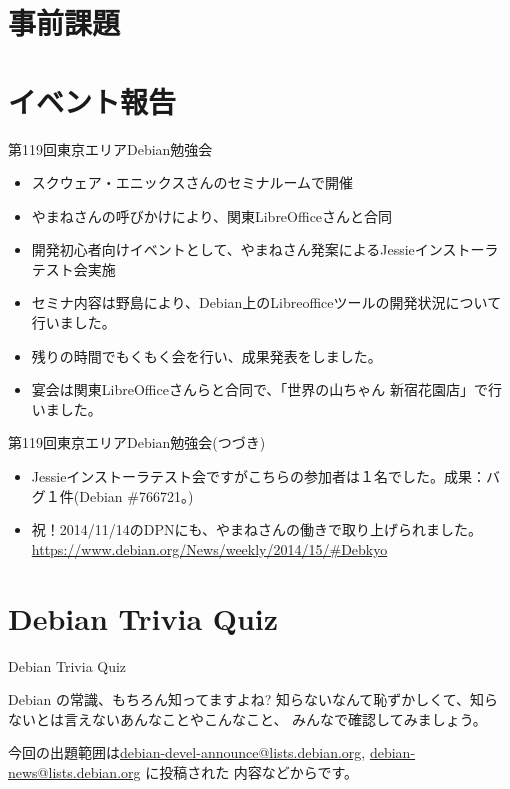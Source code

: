\section{事前課題}
{\footnotesize

}

\section{イベント報告}

\begin{frame}{第119回東京エリアDebian勉強会}
 
\begin{itemize}
\item スクウェア・エニックスさんのセミナルームで開催
\item やまねさんの呼びかけにより、関東LibreOfficeさんと合同
\item 開発初心者向けイベントとして、やまねさん発案によるJessieインストーラテスト会実施
\item セミナ内容は野島により、Debian上のLibreofficeツールの開発状況について行いました。
\item 残りの時間でもくもく会を行い、成果発表をしました。
\item 宴会は関東LibreOfficeさんらと合同で、「世界の山ちゃん 新宿花園店」で行いました。
\end{itemize} 

\end{frame}

\begin{frame}{第119回東京エリアDebian勉強会(つづき)}
 
\begin{itemize}
\item Jessieインストーラテスト会ですがこちらの参加者は１名でした。成果：バグ１件(Debian \#766721。)

\item 祝！2014/11/14のDPNにも、やまねさんの働きで取り上げられました。\\
  \url{https://www.debian.org/News/weekly/2014/15/\#Debkyo}
\end{itemize}

\end{frame}


\section{Debian Trivia Quiz}
\begin{frame}{Debian Trivia Quiz}

  Debian の常識、もちろん知ってますよね?
知らないなんて恥ずかしくて、知らないとは言えないあんなことやこんなこと、
みんなで確認してみましょう。

今回の出題範囲は\url{debian-devel-announce@lists.debian.org},
\url{debian-news@lists.debian.org} に投稿された
内容などからです。

\end{frame}

